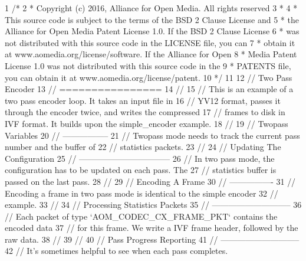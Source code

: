 \begin{DoxyCodeInclude}
1 \textcolor{comment}{/*}
2 \textcolor{comment}{ * Copyright (c) 2016, Alliance for Open Media. All rights reserved}
3 \textcolor{comment}{ *}
4 \textcolor{comment}{ * This source code is subject to the terms of the BSD 2 Clause License and}
5 \textcolor{comment}{ * the Alliance for Open Media Patent License 1.0. If the BSD 2 Clause License}
6 \textcolor{comment}{ * was not distributed with this source code in the LICENSE file, you can}
7 \textcolor{comment}{ * obtain it at www.aomedia.org/license/software. If the Alliance for Open}
8 \textcolor{comment}{ * Media Patent License 1.0 was not distributed with this source code in the}
9 \textcolor{comment}{ * PATENTS file, you can obtain it at www.aomedia.org/license/patent.}
10 \textcolor{comment}{ */}
11 
12 \textcolor{comment}{// Two Pass Encoder}
13 \textcolor{comment}{// ================}
14 \textcolor{comment}{//}
15 \textcolor{comment}{// This is an example of a two pass encoder loop. It takes an input file in}
16 \textcolor{comment}{// YV12 format, passes it through the encoder twice, and writes the compressed}
17 \textcolor{comment}{// frames to disk in IVF format. It builds upon the simple\_encoder example.}
18 \textcolor{comment}{//}
19 \textcolor{comment}{// Twopass Variables}
20 \textcolor{comment}{// -----------------}
21 \textcolor{comment}{// Twopass mode needs to track the current pass number and the buffer of}
22 \textcolor{comment}{// statistics packets.}
23 \textcolor{comment}{//}
24 \textcolor{comment}{// Updating The Configuration}
25 \textcolor{comment}{// ---------------------------------}
26 \textcolor{comment}{// In two pass mode, the configuration has to be updated on each pass. The}
27 \textcolor{comment}{// statistics buffer is passed on the last pass.}
28 \textcolor{comment}{//}
29 \textcolor{comment}{// Encoding A Frame}
30 \textcolor{comment}{// ----------------}
31 \textcolor{comment}{// Encoding a frame in two pass mode is identical to the simple encoder}
32 \textcolor{comment}{// example.}
33 \textcolor{comment}{//}
34 \textcolor{comment}{// Processing Statistics Packets}
35 \textcolor{comment}{// -----------------------------}
36 \textcolor{comment}{// Each packet of type `AOM\_CODEC\_CX\_FRAME\_PKT` contains the encoded data}
37 \textcolor{comment}{// for this frame. We write a IVF frame header, followed by the raw data.}
38 \textcolor{comment}{//}
39 \textcolor{comment}{//}
40 \textcolor{comment}{// Pass Progress Reporting}
41 \textcolor{comment}{// -----------------------------}
42 \textcolor{comment}{// It's sometimes helpful to see when each pass completes.}

\end{DoxyCodeInclude}
